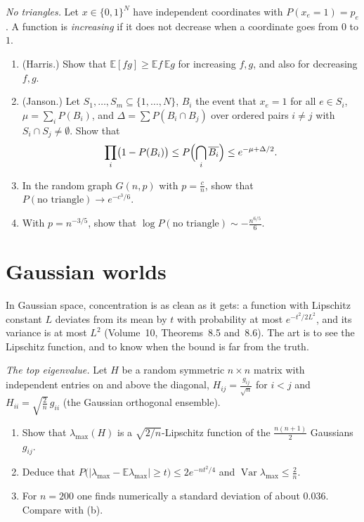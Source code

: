 \begin{exercise}[$\star\star\star$]\label{pb:janson}
\emph{No triangles.} Let $x\in\{0,1\}^N$ have independent coordinates with $P(x_e=1)=p_e$. A function is \emph{increasing} if it does not decrease when a coordinate
goes from $0$ to $1$.
\begin{enumerate}[label=(\alph*)]
\item (Harris.) Show that $\mathbb E[fg]\ge\mathbb Ef\,\mathbb Eg$ for increasing $f,g$, and also for decreasing $f,g$.
\item (Janson.) Let $S_1,\dots,S_m\subseteq\{1,\dots,N\}$, $B_i$ the event that $x_e=1$ for all $e\in S_i$, $\mu=\sum_iP(B_i)$, and
$\Delta=\sum P(B_i\cap B_j)$ over ordered pairs $i\ne j$ with $S_i\cap S_j\ne\emptyset$. Show that
\[
\prod_i\bigl(1-P(B_i)\bigr)\le P\Bigl(\bigcap_i\overline{B_i}\Bigr)\le e^{-\mu+\Delta/2}.
\]
\item In the random graph $G(n,p)$ with $p=\frac cn$, show that $P(\text{no triangle})\to e^{-c^3/6}$.
\item With $p=n^{-3/5}$, show that $\log P(\text{no triangle})\sim-\frac{n^{6/5}}6$.
\end{enumerate}
\end{exercise}

\section{Gaussian worlds}

In Gaussian space, concentration is as clean as it gets: a function with Lipschitz constant $L$ deviates from its mean by $t$ with probability at most $e^{-t^2/2L^2}$, and
its variance is at most $L^2$ (Volume~10, Theorems~8.5 and~8.6). The art is to see the Lipschitz function, and to know when the bound is far from the truth.

\begin{exercise}[$\star$]\label{pb:lambdamax}
\emph{The top eigenvalue.} Let $H$ be a random symmetric $n\times n$ matrix with independent entries on and above the diagonal, $H_{ij}=\frac{g_{ij}}{\sqrt n}$ for $i<j$
and $H_{ii}=\sqrt{\frac2n}\,g_{ii}$ (the Gaussian orthogonal ensemble).
\begin{enumerate}[label=(\alph*)]
\item Show that $\lambda_{\max}(H)$ is a $\sqrt{2/n}$-Lipschitz function of the $\frac{n(n+1)}2$ Gaussians $g_{ij}$.
\item Deduce that $P\bigl(|\lambda_{\max}-\mathbb E\lambda_{\max}|\ge t\bigr)\le2e^{-nt^2/4}$ and $\operatorname{Var}\lambda_{\max}\le\frac2n$.
\item For $n=200$ one finds numerically a standard deviation of about $0.036$. Compare with (b).
\end{enumerate}
\end{exercise}

